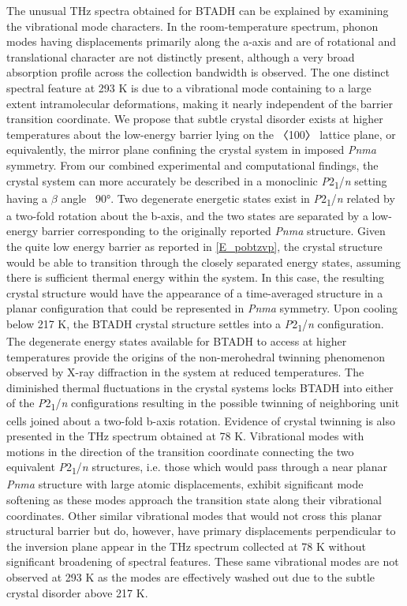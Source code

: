 The unusual THz spectra obtained for BTADH can be explained by examining the vibrational mode characters. In the room-temperature spectrum, phonon modes having displacements primarily along the a-axis and are of rotational and translational character are not distinctly present, although a very broad absorption profile across the collection bandwidth is observed. The one distinct spectral feature at 293 K is due to a vibrational mode containing to a large extent intramolecular deformations, making it nearly independent of the barrier transition coordinate. We propose that subtle crystal disorder exists at higher temperatures about the low-energy barrier lying on the 〈100〉 lattice plane, or equivalently, the mirror plane confining the crystal system in imposed \textit{Pnma} symmetry. From our combined experimental and computational findings, the crystal system can more accurately be described in a monoclinic \textit{P}2\textsubscript{1}/\textit{n} setting having a \(\beta\) angle ~90°. Two degenerate energetic states exist in \textit{P}2\textsubscript{1}/\textit{n} related by a two-fold rotation about the b-axis, and the two states are separated by a low-energy barrier corresponding to the originally reported \textit{Pnma} structure. Given the quite low energy barrier as reported in \autoref{E_pobtzvp}, the crystal structure would be able to transition through the closely separated energy states, assuming there is sufficient thermal energy within the system. In this case, the resulting crystal structure would have the appearance of a time-averaged structure in a planar configuration that could be represented in \textit{Pnma} symmetry. 
Upon cooling below 217 K, the BTADH crystal structure settles into a \textit{P}2\textsubscript{1}/\textit{n} configuration. The degenerate energy states available for BTADH to access at higher temperatures provide the origins of the non-merohedral twinning phenomenon observed by X-ray diffraction in the system at reduced temperatures. The diminished thermal fluctuations in the crystal systems locks BTADH into either of the \textit{P}2\textsubscript{1}/\textit{n} configurations resulting in the possible twinning of neighboring unit cells joined about a two-fold b-axis rotation. Evidence of crystal twinning is also presented in the THz spectrum obtained at 78 K. Vibrational modes with motions in the direction of the transition coordinate connecting the two equivalent \textit{P}2\textsubscript{1}/\textit{n} structures, i.e. those which would pass through a near planar \textit{Pnma} structure with large atomic displacements, exhibit significant mode softening as these modes approach the transition state along their vibrational coordinates. Other similar vibrational modes that would not cross this planar structural barrier but do, however, have primary displacements perpendicular to the inversion plane appear in the THz spectrum collected at 78 K without significant broadening of spectral features. These same vibrational modes are not observed at 293 K as the modes are effectively washed out due to the subtle crystal disorder above 217 K.

